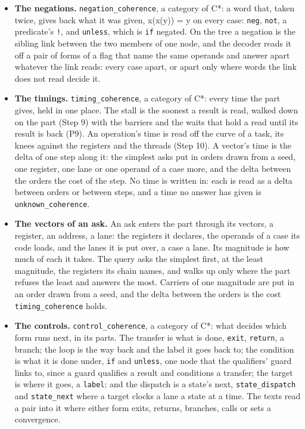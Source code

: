 \begin{itemize}
\item \textbf{The negations.} \texttt{negation\_\allowbreak{}coherence}, a category of C*: a word that, taken twice, gives back what it was given, x(x(y)) = y on every case: \texttt{neg}, \texttt{not}, a predicate's \texttt{!}, and \texttt{unless}, which is \texttt{if} negated. On the tree a negation is the sibling link between the two members of one node, and the decoder reads it off a pair of forms of a flag that name the same operands and answer apart whatever the link reads: every case apart, or apart only where words the link does not read decide it.
\item \textbf{The timings.} \texttt{timing\_\allowbreak{}coherence}, a category of C*: every time the part gives, held in one place. The stall is the soonest a result is read, walked down on the part (Step 9) with the barriers and the waits that hold a read until its result is back (P9). An operation's time is read off the curve of a task, its knees against the registers and the threads (Step 10). A vector's time is the delta of one step along it: the simplest asks put in orders drawn from a seed, one register, one lane or one operand of a case more, and the delta between the orders the cost of the step. No time is written in: each is read as a delta between orders or between steps, and a time no answer has given is \texttt{unknown\_\allowbreak{}coherence}.
\item \textbf{The vectors of an ask.} An ask enters the part through its vectors, a register, an address, a lane: the registers it declares, the operands of a case its code loads, and the lanes it is put over, a case a lane. Its magnitude is how much of each it takes. The query asks the simplest first, at the least magnitude, the registers its chain names, and walks up only where the part refuses the least and answers the most. Carriers of one magnitude are put in an order drawn from a seed, and the delta between the orders is the cost \texttt{timing\_\allowbreak{}coherence} holds.
\item \textbf{The controls.} \texttt{control\_\allowbreak{}coherence}, a category of C*: what decides which form runs next, in its parts. The transfer is what is done, \texttt{exit}, \texttt{return}, a branch; the loop is the way back and the label it goes back to; the condition is what it is done under, \texttt{if} and \texttt{unless}, one node that the qualifiers' guard links to, since a guard qualifies a result and conditions a transfer; the target is where it goes, a \texttt{label}; and the dispatch is a state's next, \texttt{state\_\allowbreak{}dispatch} and \texttt{state\_\allowbreak{}next} where a target clocks a lane a state at a time. The texts read a pair into it where either form exits, returns, branches, calls or sets a convergence.

\end{itemize}
